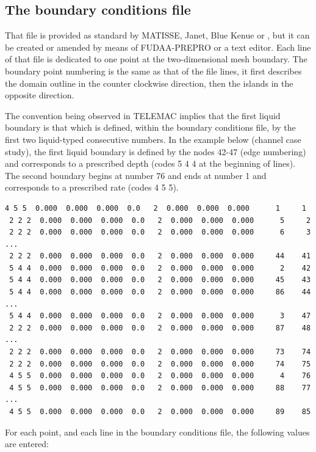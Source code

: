 \subsection{The boundary conditions file}
\label{sec:bndfile}
That file is provided as standard by MATISSE, Janet, Blue Kenue or \stbtel, but
it can be created or amended by means of FUDAA-PREPRO or a text editor. Each
line of that file is dedicated to one point at the two-dimensional mesh
boundary. The boundary point numbering is the same as that of the file lines,
it first describes the domain outline in the counter clockwise direction, then
the islands in the opposite direction.

The convention being observed in TELEMAC implies that the first liquid boundary
is that which is defined, within the boundary conditions file, by the first two
liquid-typed consecutive numbers. In the example below (channel case study),
the first liquid boundary is defined by the nodes 42-47 (edge numbering) and
corresponds to a prescribed depth (codes 5 4 4 at the beginning of lines). The
second boundary begins at number 76 and ends at number 1 and corresponds to a
prescribed rate (codes 4 5 5).

\begin{lstlisting}[language=bash]
 4 5 5  0.000  0.000  0.000  0.0   2  0.000  0.000  0.000      1     1
 2 2 2  0.000  0.000  0.000  0.0   2  0.000  0.000  0.000      5     2
 2 2 2  0.000  0.000  0.000  0.0   2  0.000  0.000  0.000      6     3
...
 2 2 2  0.000  0.000  0.000  0.0   2  0.000  0.000  0.000     44    41
 5 4 4  0.000  0.000  0.000  0.0   2  0.000  0.000  0.000      2    42
 5 4 4  0.000  0.000  0.000  0.0   2  0.000  0.000  0.000     45    43
 5 4 4  0.000  0.000  0.000  0.0   2  0.000  0.000  0.000     86    44
...
 5 4 4  0.000  0.000  0.000  0.0   2  0.000  0.000  0.000      3    47
 2 2 2  0.000  0.000  0.000  0.0   2  0.000  0.000  0.000     87    48
...
 2 2 2  0.000  0.000  0.000  0.0   2  0.000  0.000  0.000     73    74
 2 2 2  0.000  0.000  0.000  0.0   2  0.000  0.000  0.000     74    75
 4 5 5  0.000  0.000  0.000  0.0   2  0.000  0.000  0.000      4    76
 4 5 5  0.000  0.000  0.000  0.0   2  0.000  0.000  0.000     88    77
...
 4 5 5  0.000  0.000  0.000  0.0   2  0.000  0.000  0.000     89    85
\end{lstlisting}

For each point, and each line in the boundary conditions file, the following
values are entered:


